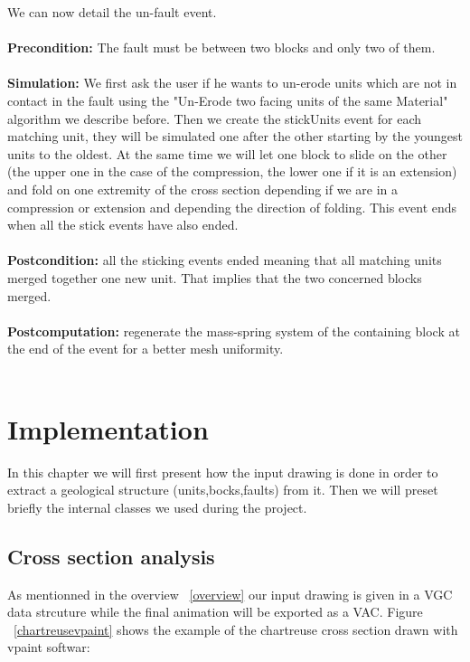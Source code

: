 \documentclass[12pt, a4paper]{report} %
\begin{document}
We can now detail the un-fault event.\\\\
\textbf{Precondition:} The fault must be between two blocks and only two of them.\\\\
\textbf{Simulation:} We first ask the user if he wants to un-erode units which are not in contact in the fault using the "Un-Erode two facing units of the same Material" algorithm we describe before. Then we create the stickUnits event for each matching unit, they will be simulated one after the other starting by the youngest units to the oldest. At the same time we will let one block to slide on the other (the upper one in the case of the compression, the lower one if it is an extension) and fold on one extremity of the cross section depending if we are in a compression or extension and depending the direction of folding. This event ends when all the stick events have also ended.\\\\
\textbf{Postcondition:} all the sticking events ended meaning that all matching units merged together one new unit. That implies that the two concerned blocks merged.\\\\
\textbf{Postcomputation:} regenerate the mass-spring system of the containing block at the end of the event for a better mesh uniformity.\\\\ 
	


 
 
\chapter{Implementation}
 In this chapter we will first present how the input drawing is done in order to extract a geological structure (units,bocks,faults) from it. Then we will preset briefly the internal classes we used during the project.
 
\section{Cross section analysis}

As mentionned in the overview ~\ref{overview} our input drawing is given in a VGC data strcuture while the final animation will be exported as a VAC. 
Figure ~\ref{chartreusevpaint} shows the example of the chartreuse cross section drawn with vpaint softwar:
\end{document}
